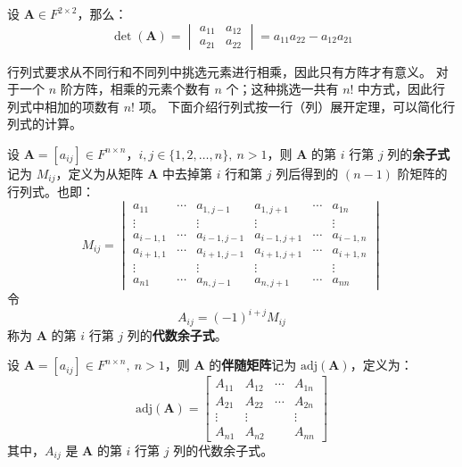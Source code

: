 \begin{example}
    设 $\mathbf{A}\in F^{2\times 2}$，那么：
    \[
        \det(\mathbf{A}) = \begin{vmatrix}
            a_{11} & a_{12} \\
            a_{21} & a_{22}
        \end{vmatrix} = a_{11}a_{22} - a_{12}a_{21}
    \]
\end{example}

\begin{note}
    行列式要求从不同行和不同列中挑选元素进行相乘，因此只有方阵才有意义。
    对于一个 $n$ 阶方阵，相乘的元素个数有 $n$ 个；这种挑选一共有 $n!$ 中方式，因此行列式中相加的项数有 $n!$ 项。
    下面介绍行列式按一行（列）展开定理，可以简化行列式的计算。
\end{note}
\vspace{1em}

\begin{definition}
    设 $\mathbf{A} = [a_{ij}] \in F^{n \times n}$，$i,j\in\{1,2,\ldots,n\},\ n > 1$，则 $\mathbf{A}$ 的第 $i$ 行第 $j$ 列的\textbf{余子式}记为 $M_{ij}$，定义为从矩阵 $\mathbf{A}$ 中去掉第 $i$ 行和第 $j$ 列后得到的 $(n-1)$ 阶矩阵的行列式。也即：
    \[
        M_{ij}=\begin{vmatrix}a_{11} &\cdots & a_{1, j-1} & a_{1, j+1} & \cdots& a_{1 n} \\ \vdots &  & \vdots & \vdots & & \vdots \\ a_{i-1,1} & \cdots& a_{i-1, j-1} & a_{i-1, j+1} & \cdots & a_{i-1, n} \\ a_{i+1,1} & \cdots & a_{i+1, j-1} & a_{i+1, j+1} & \cdots & a_{i+1, n} \\ \vdots & & \vdots & \vdots & & \vdots \\ a_{n 1} & \cdots & a_{n, j-1} & a_{n, j+1} &\cdots & a_{n n} \end{vmatrix}
    \]
    令
    \[
        A_{ij} = (-1)^{i+j} M_{ij}
    \]
    称为 $\mathbf{A}$ 的第 $i$ 行第 $j$ 列的\textbf{代数余子式}。
\end{definition}

\begin{definition}
    设 $\mathbf{A} = [a_{ij}] \in F^{n \times n},\ n > 1$，则 $\mathbf{A}$ 的\textbf{伴随矩阵}记为 $\mathrm{adj}(\mathbf{A})$，定义为：
    \[
        \mathrm{adj}(\mathbf{A}) = \begin{bmatrix} A_{11} & A_{12} & \cdots & A_{1 n} \\ A_{21} & A_{22} & \cdots & A_{2 n} \\ \vdots & \vdots & & \vdots \\ A_{n 1} & A_{n 2} & & A_{n n} \end{bmatrix}
    \]
    其中，$A_{ij}$ 是 $\mathbf{A}$ 的第 $i$ 行第 $j$ 列的代数余子式。
    
\end{definition}


